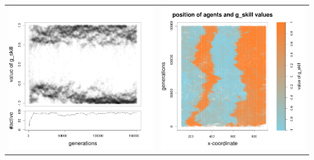\documentclass[a4paper,10pt]{article}
\begin{document}
\begin{table}[h!]
\begin{tabular}{cc}
 \newline
 \includegraphics[width=\imgSize]{images/5StaticEnv/Gplot29_staticEnv1}&\includegraphics[width=\imgSize]{images/5StaticEnv/Gplot29Static_staticEnv1}\\

\end{tabular}
\end{table}
\end{document}
